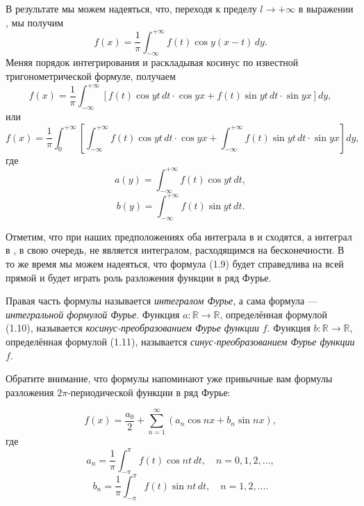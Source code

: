 {В результате мы можем надеяться, что, переходя к пределу $l \to +\infty$ в выражении , мы получим
\[
f(x) = \frac{1}{\pi} \int_{-\infty}^{+\infty} f(t) \cos y(x - t) \, dy. \tag{1.7}   
\]
Меняя порядок интегрирования и раскладывая косинус по известной тригонометрической формуле, получаем
\[
f(x) = \frac{1}{\pi} \int_{-\infty}^{+\infty} \left[ f(t) \cos y t \, dt \cdot \cos y x + f(t) \sin y t \, dt \cdot \sin y x \right] dy,    \tag{1.8}
\]
или
\[
f(x) = \frac{1}{\pi} \int_{0}^{+\infty} \left[ \int_{-\infty}^{+\infty} f(t) \cos y t \, dt \cdot \cos y x + \int_{-\infty}^{+\infty} f(t) \sin y t \, dt \cdot \sin y x \right] dy, \tag{1.9}
\]
где
\[
a(y) = \int_{-\infty}^{+\infty} f(t) \cos y t \, dt, \tag{1.10}
\]
\[
b(y) = \int_{-\infty}^{+\infty} f(t) \sin y t \, dt. \tag{1.11}
\]

Отметим, что при наших предположениях оба интеграла в  и  сходятся, а интеграл в , в свою очередь, не является интегралом, расходящимся на бесконечности. В то же время мы можем надеяться, что формула (1.9) будет справедлива на всей прямой и будет играть роль разложения функции в ряд Фурье.



Правая часть формулы называется \textit{интегралом Фурье}, а сама формула  — \textit{интегральной формулой Фурье}. Функция $a : \mathbb{R} \to \mathbb{R}$, определённая формулой (1.10), называется \textit{косинус-преобразованием Фурье функции} $f$. Функция $b : \mathbb{R} \to \mathbb{R}$, определённая формулой (1.11), называется \textit{синус-преобразованием Фурье функции} $f$.

Обратите внимание, что формулы  напоминают уже привычные вам формулы разложения $2\pi$-периодической функции в ряд Фурье:

\[
f(x) = \frac{a_0}{2} + \sum_{n=1}^{\infty} \left( a_n \cos n x + b_n \sin n x \right), \tag{1.12}
\]
где
\[
a_n = \frac{1}{\pi} \int_{-\pi}^{\pi} f(t) \cos n t \, dt, \quad n = 0, 1, 2, \dots, \tag{1.13}
\]
\[
b_n = \frac{1}{\pi} \int_{-\pi}^{\pi} f(t) \sin n t \, dt, \quad n = 1, 2, \dots.   \tag{1.14}
\]
}
